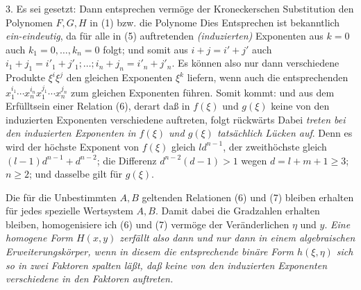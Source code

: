 3. Es sei gesetzt:
Dann entsprechen vermöge der Kroneckerschen Substitution den Polynomen $F,G,H$ in (1) bzw. die Polynome
Dies Entsprechen ist bekanntlich \emph{ein-eindeutig}, da für alle in (5) auftretenden \emph{(induzierten)} Exponenten aus $k=0$ auch $k_1=0,\ldots,k_n=0$ folgt; und somit aus $i+j=i'+j'$ auch $i_1+j_1=i'_1+j'_1;\ldots;i_n+j_n=i'_n+j'_n$. Es können also nur dann verschiedene Produkte $\xi^i\xi^j$ den gleichen Exponenten $\xi^k$ liefern, wenn auch die entsprechenden $x_1^{i_1}\cdots x_n^{i_n}x_1^{j_1}\cdots x_n^{j_n}$ zum gleichen Exponenten führen. Somit kommt:
und aus dem Erfülltsein einer Relation (6), derart daß in $f(\xi)$ und $g(\xi)$ keine von den induzierten Exponenten verschiedene auftreten, folgt rückwärts
Dabei \emph{treten bei den induzierten Exponenten in $f(\xi)$ und $g(\xi)$ tatsächlich Lücken auf}. Denn es wird der höchste Exponent von $f(\xi)$ gleich $ld^{n-1}$, der zweithöchste gleich $(l-1)d^{n-1}+d^{n-2}$; die Differenz $d^{n-2}(d-1)>1$ wegen $d=l+m+1\ge3$; $n\ge2$; und dasselbe gilt für $g(\xi)$.

Die für die Unbestimmten $A,B$ geltenden Relationen (6) und (7) bleiben erhalten für jedes spezielle Wertsystem $A,B$. Damit dabei die Gradzahlen erhalten bleiben, homogenisiere ich (6) und (7) vermöge der Veränderlichen $\eta$ und $y$. \emph{Eine homogene Form $H(x,y)$ zerfällt also dann und nur dann in einem algebraischen Erweiterungskörper, wenn in diesem die entsprechende binäre Form $h(\xi,\eta)$ sich so in zwei Faktoren spalten läßt, daß keine von den induzierten Exponenten verschiedene in den Faktoren auftreten.}

